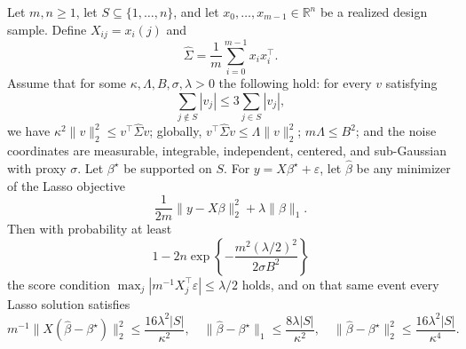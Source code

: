 \begin{theorem}
Let $m,n\ge1$, let $S\subseteq\{1,\ldots,n\}$, and let
$x_0,\ldots,x_{m-1}\in\mathbb R^n$ be a realized design sample.  Define
$X_{ij}=x_i(j)$ and
\[
  \widehat\Sigma=\frac1m\sum_{i=0}^{m-1}x_i x_i^\top.
\]
Assume that for some $\kappa,\Lambda,B,\sigma,\lambda>0$ the following
hold: for every $v$ satisfying
\[
  \sum_{j\notin S}|v_j|\le3\sum_{j\in S}|v_j|,
\]
we have $\kappa^2\|v\|_2^2\le v^\top\widehat\Sigma v$; globally,
$v^\top\widehat\Sigma v\le\Lambda\|v\|_2^2$; $m\Lambda\le B^2$; and the
noise coordinates are measurable, integrable, independent, centered, and
sub-Gaussian with proxy $\sigma$.  Let $\beta^\star$ be supported on $S$.
For $y=X\beta^\star+\varepsilon$, let $\widehat\beta$ be any minimizer of
the Lasso objective
\[
  \frac1{2m}\|y-X\beta\|_2^2+\lambda\|\beta\|_1.
\]
Then with probability at least
\[
  1-2n\exp\!\left\{-\frac{m^2(\lambda/2)^2}{2\sigma B^2}\right\}
\]
the score condition $\max_j|m^{-1}X_j^\top\varepsilon|\le\lambda/2$ holds,
and on that same event every Lasso solution satisfies
\[
  m^{-1}\|X(\widehat\beta-\beta^\star)\|_2^2\le\frac{16\lambda^2|S|}{\kappa^2},
  \quad
  \|\widehat\beta-\beta^\star\|_1\le\frac{8\lambda|S|}{\kappa^2},
  \quad
  \|\widehat\beta-\beta^\star\|_2^2\le\frac{16\lambda^2|S|}{\kappa^4}.
\]
\end{theorem}
